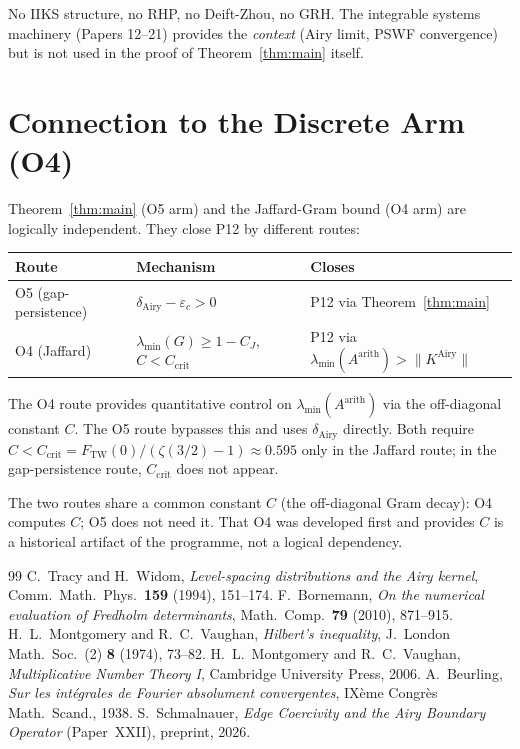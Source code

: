 \documentclass[12pt,a4paper]{amsart}
\theoremstyle{definition}
\newcommand{\KAi}{K^{\mathrm{Airy}}}
\begin{document}
\medskip
No IIKS structure, no RHP, no Deift-Zhou, no GRH.
The integrable systems machinery (Papers 12--21) provides the
\emph{context} (Airy limit, PSWF convergence) but is not
used in the proof of Theorem~\ref{thm:main} itself.

\section{Connection to the Discrete Arm (O4)}
\label{sec:o4}

Theorem~\ref{thm:main} (O5 arm) and the Jaffard-Gram bound (O4 arm)
are logically independent. They close P12 by different routes:

\begin{center}
\begin{tabular}{lll}
\toprule
Route & Mechanism & Closes\\
\midrule
O5 (gap-persistence) & $\delta_{\mathrm{Airy}} - \varepsilon_c > 0$ & P12 via Theorem~\ref{thm:main}\\
O4 (Jaffard) & $\lambda_{\min}(G) \ge 1 - C_J$, $C < C_{\mathrm{crit}}$ & P12 via $\lambda_{\min}(A^{\mathrm{arith}}) > \|\KAi\|$\\
\bottomrule
\end{tabular}
\end{center}

\medskip
The O4 route provides quantitative control on $\lambda_{\min}(A^{\mathrm{arith}})$
via the off-diagonal constant $C$.
The O5 route bypasses this and uses $\delta_{\mathrm{Airy}}$ directly.
Both require $C < C_{\mathrm{crit}} = F_{\mathrm{TW}}(0)/(\zeta(3/2)-1) \approx 0.595$
only in the Jaffard route; in the gap-persistence route, $C_{\mathrm{crit}}$ does not appear.

The two routes share a common constant $C$ (the off-diagonal Gram decay):
O4 computes $C$; O5 does not need it.
That O4 was developed first and provides $C$ is a historical artifact
of the programme, not a logical dependency.

\begin{thebibliography}{99}
C.~Tracy and H.~Widom,
\textit{Level-spacing distributions and the Airy kernel},
Comm.\ Math.\ Phys.\ \textbf{159} (1994), 151--174.
F.~Bornemann,
\textit{On the numerical evaluation of Fredholm determinants},
Math.\ Comp.\ \textbf{79} (2010), 871--915.
H.~L.~Montgomery and R.~C.~Vaughan,
\textit{Hilbert's inequality},
J.\ London Math.\ Soc.\ (2) \textbf{8} (1974), 73--82.
H.~L.~Montgomery and R.~C.~Vaughan,
\textit{Multiplicative Number Theory I},
Cambridge University Press, 2006.
A.~Beurling,
\textit{Sur les int\'egrales de Fourier absolument convergentes},
IX\`eme Congr\`es Math.\ Scand., 1938.
S.~Schmalnauer,
\textit{Edge Coercivity and the Airy Boundary Operator} (Paper~XXII),
preprint, 2026.
\end{thebibliography}
\end{document}
